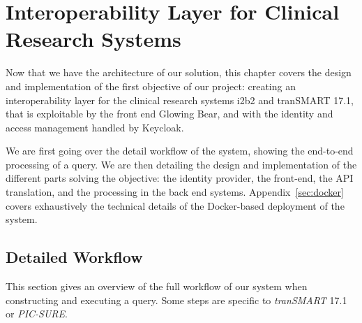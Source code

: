 
\chapter{Interoperability Layer for Clinical Research Systems}

Now that we have the architecture of our solution, this chapter covers the design and implementation of the first objective of our project: creating an interoperability layer for the clinical research systems i2b2 and tranSMART 17.1, that is exploitable by the front end Glowing Bear, and with the identity and access management handled by Keycloak.

We are first going over the detail workflow of the system, showing the end-to-end processing of a query.
We are then detailing the design and implementation of the different parts solving the objective: the identity provider, the front-end, the API translation, and the processing in the back end systems.
Appendix~\ref{sec:docker} covers exhaustively the technical details of the Docker-based deployment of the system.


\section{Detailed Workflow}

This section gives an overview of the full workflow of our system when constructing and executing a query.
Some steps are specific to \textit{tranSMART} 17.1 or \textit{PIC-SURE}.

